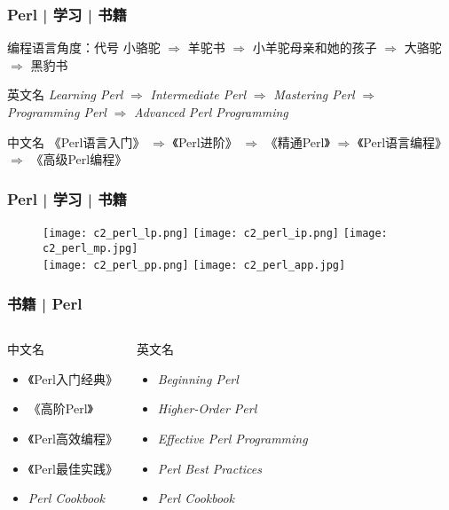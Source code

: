 \begin{frame}
  \frametitle{Perl | 学习 | 书籍}
  \begin{block}{编程语言角度：代号}
小骆驼 $\Rightarrow$ 羊驼书 $\Rightarrow$ 小羊驼母亲和她的孩子 $\Rightarrow$ 大骆驼 $\Rightarrow$ 黑豹书
  \end{block}
  \pause
  \begin{block}{英文名}
    \textit{Learning Perl} $\Rightarrow$ \textit{Intermediate Perl} $\Rightarrow$ \textit{Mastering Perl} $\Rightarrow$ \textit{Programming Perl} $\Rightarrow$ \textit{Advanced Perl Programming}
  \end{block}
  \pause
  \begin{block}{中文名}
    \alert{《Perl语言入门》} $\Rightarrow$ 《Perl进阶》 $\Rightarrow$ 《精通Perl》 $\Rightarrow$ 《Perl语言编程》 $\Rightarrow$ 《高级Perl编程》
  \end{block}
  \pause
\end{frame}

\begin{frame}
  \frametitle{Perl | 学习 | 书籍}
  \begin{figure}
    \centering
    \texttt{[image: c2\_perl\_lp.png]}
    \qquad
    \texttt{[image: c2\_perl\_ip.png]}
    \qquad
    \texttt{[image: c2\_perl\_mp.jpg]}\\
    \texttt{[image: c2\_perl\_pp.png]}
    \hspace{2cm}
    \texttt{[image: c2\_perl\_app.jpg]}
  \end{figure}
\end{frame}

\begin{frame}
  \frametitle{书籍 | Perl}
  \begin{columns}
  \begin{block}{中文名}
    \begin{itemize}
      \item \alert{《Perl入门经典》}
      \item 《高阶Perl》
      \item 《Perl高效编程》
      \item 《Perl最佳实践》
      \item \textit{Perl Cookbook}
    \end{itemize}
  \end{block}
  \begin{block}{英文名}
    \begin{itemize}
      \item \textit{Beginning Perl}
      \item \textit{Higher-Order Perl}
      \item \textit{Effective Perl Programming}
      \item \textit{Perl Best Practices}
      \item \textit{Perl Cookbook}
    \end{itemize}
  \end{block}
\end{columns}
\end{frame}

